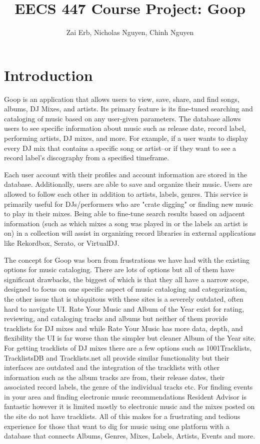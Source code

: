 \documentclass{article}
\title{EECS 447 Course Project: Goop}
\author{Zai Erb, Nicholas Nguyen, Chinh Nguyen}
\date{}
\begin{document}
\maketitle

\tableofcontents

\newpage

\section{Introduction}

Goop is an application that allows users to view, save, share, and find songs, albums, DJ Mixes, and artists. Its primary feature is its fine-tuned searching and cataloging of music based on any user-given parameters. The database allows users to see specific information about music such as release date, record label, performing artists, DJ mixes, and more. For example, if a user wants to display every DJ mix that contains a specific song or artist–or if they want to see a record label's discography from a specified timeframe. 

Each user account with their profiles and account information are stored in the database. Additionally, users are able to save and organize their music. Users are allowed to follow each other in addition to artists, labels, genres. This service is primarily useful for DJs/performers who are "crate digging" or finding new music to play in their mixes. Being able to fine-tune search results based on adjacent information (such as which mixes a song was played in or the labels an artist is on) in a collection will assist in organizing record libraries in external applications like Rekordbox, Serato, or VirtualDJ. 

The concept for Goop was born from frustrations we have had with the existing options for music cataloging. There are lots of options but all of them have significant drawbacks, the biggest of which is that they all have a narrow scope, designed to focus on one specific aspect of music cataloging and categorization, the other issue that is ubiquitous with these sites is a severely outdated, often hard to navigate UI. Rate Your Music and Album of the Year exist for rating, reviewing, and cataloging tracks and albums but neither of them provide tracklists for DJ mixes and while Rate Your Music has more data, depth, and flexibility the UI is far worse than the simpler but cleaner Album of the Year site. For getting tracklists of DJ mixes there are a few options such as 1001Tracklists, TracklistsDB and Tracklists.net all provide similar functionality but their interfaces are outdated and the integration of the tracklists with other information such as the album tracks are from, their release dates, their associated record labels, the genre of the individual tracks etc. For finding events in your area and finding electronic music recommendations Resident Advisor is fantastic however it is limited mostly to electronic music and the mixes posted on the site do not have tracklists. All of this makes for a frustrating and tedious experience for those that want to dig for music using one platform with a database that connects Albums, Genres, Mixes, Labels, Artists, Events and more. 
\end{document}
